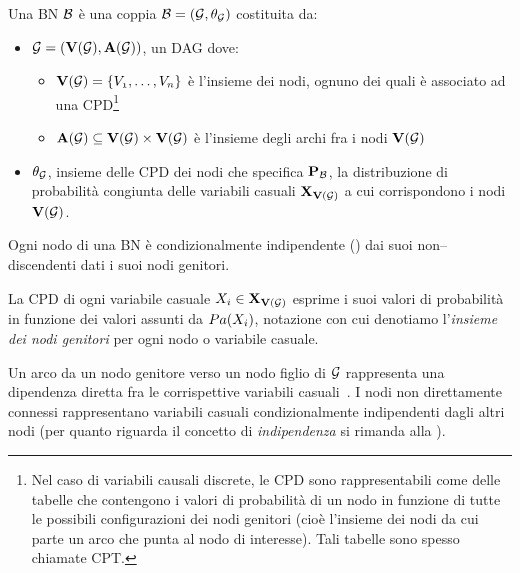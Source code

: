 \begin{definizione}[\acl{BN}]
\label{defn:bn}
Una \acl{BN} $\mathcal{B}$ è una coppia $\mathcal{B}=(\mathcal{G},\theta_{\mathcal{G}})$ costituita da:
\begin{itemize}
    \item $\mathcal{G}=(\mathbf{V}(\mathcal{G}),\mathbf{A}(\mathcal{G}))$, un \acl{DAG} dove:
    \begin{itemize}
        \item $\mathbf{V}(\mathcal{G})=\{\mathnormal{V_1}, \dotsc, \mathnormal{V_n}\}$ è l'insieme dei nodi, ognuno dei quali è associato ad una \acf{CPD}\footnote{Nel caso di variabili causali discrete, le \acs{CPD} sono rappresentabili come delle tabelle che contengono i valori di probabilità di un nodo in funzione di tutte le possibili configurazioni dei nodi genitori (cioè l'insieme dei nodi da cui parte un arco che punta al nodo di interesse). Tali tabelle sono spesso chiamate \acf{CPT}.}
        \item $\mathbf{A}(\mathcal{G})\subseteq\mathbf{V}(\mathcal{G})\times\mathbf{V}(\mathcal{G})$ è l'insieme degli archi fra i nodi $\mathbf{V}(\mathcal{G})$
    \end{itemize}
    \item $\theta_{\mathcal{G}}$, insieme delle \acs{CPD} dei nodi che specifica $\mathbf{P}_{\mathcal{B}}$, la distribuzione di probabilità congiunta delle variabili casuali $\mathbf{X}_{\mathbf{V}(\mathcal{G})}$ a cui corrispondono i nodi $\mathbf{V}(\mathcal{G})$.
\end{itemize}
\end{definizione}
\begin{osservazione}\label{oss:bn-markov-assumption}
Ogni nodo di una \acs{BN} è condizionalmente indipendente () dai suoi non--discendenti dati i suoi nodi genitori.
\end{osservazione}

La \acs{CPD} di ogni variabile casuale $\mathnormal{X_i}\in\mathbf{X}_{\mathbf{V}(\mathcal{G})}$ esprime i suoi valori di probabilità in funzione dei valori assunti da $Pa(\mathnormal{X_i})$, notazione con cui denotiamo l'\emph{insieme dei nodi genitori} per ogni nodo o variabile casuale.

Un arco da un nodo genitore verso un nodo figlio di $\mathcal{G}$ rappresenta una dipendenza diretta fra le corrispettive variabili casuali~\citep[si veda][sezione 14.1]{Russel2003}. I nodi non direttamente connessi rappresentano variabili casuali condizionalmente indipendenti dagli altri nodi (per quanto riguarda il concetto di \emph{indipendenza \cond*{}} si rimanda alla ).

